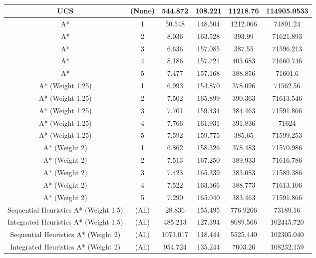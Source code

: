 \documentclass[a4paper]{article}
\begin{document}
\begin{table}[H]
\centering
\begin{tabular}{|c|c|c|c|c|c|}
\hline
UCS & (None) & 544.872 & 108.221 & 11218.76 & 114905.0533\\ 
\hline
A* & 1 & 50.548 & 148.504 & 1212.066 & 74891.24\\ 
\hline
A* & 2 & 8.036 & 163.528 & 393.99 & 71621.893\\ 
\hline
A* & 3 & 6.636 & 157.085 & 387.55 & 71596.213\\ 
\hline
A* & 4 & 8.186 & 157.721 & 403.683 & 71660.746\\ 
\hline
A* & 5 & 7.477 & 157.168 & 388.856 & 71601.6\\ 
\hline
A* (Weight 1.25) & 1 & 6.993 & 154.870 & 378.096 & 71562.56\\ 
\hline
A* (Weight 1.25) & 2 & 7.502 & 165.899 & 390.363 & 71613.546\\ 
\hline
A* (Weight 1.25) & 3 & 7.701 & 159.434 & 384.463 & 71591.866\\ 
\hline
A* (Weight 1.25) & 4 & 7.766 & 161.931 & 391.836 & 71624\\ 
\hline
A* (Weight 1.25) & 5 & 7.592 & 159.775 & 385.65 & 71599.253\\ 
\hline
A* (Weight 2) & 1 & 6.862 & 158.326 & 378.483 & 71570.986\\ 
\hline
A* (Weight 2) & 2 & 7.513 & 167.250 & 389.933 & 71616.786\\ 
\hline
A* (Weight 2) & 3 & 7.423 & 165.339 & 383.083 & 71589.386\\ 
\hline
A* (Weight 2) & 4 & 7.522 & 163.366 & 388.773 & 71613.106\\ 
\hline
A* (Weight 2) & 5 & 7.290 & 165.040 & 383.463 & 71591.866\\ 
\hline
Sequential Heuristics A* (Weight 1.5) & (All) & 28.836 & 155.495 & 776.9266 & 73189.16\\
\hline
Integrated Heuristics A* (Weight 1.5) & (All) & 485.213 & 127.394 & 8089.566 & 102445.720\\ 
\hline
Sequential Heuristics A* (Weight 2) & (All) & 1073.017 & 118.444 & 5525.440 & 102305.040\\ 
\hline
Integrated Heuristics A* (Weight 2) & (All) & 954.724 & 135.244 & 7003.26 & 108232.159\\ 
\hline
\hline\end{tabular}
\caption{Heuristic Type(1: Euclidian, 2: Manhattan, 3: Octile, 4: Chebyshev, 5: Straight Diagonal Distance) }
\label{table:table}
\caption{\small{}} 
\end{table}
\end{document}

